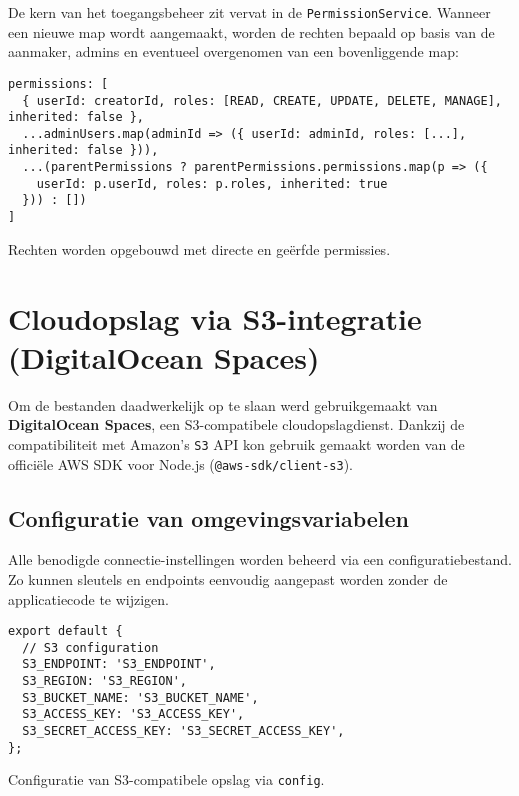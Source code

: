 De kern van het toegangsbeheer zit vervat in de \texttt{PermissionService}. Wanneer een nieuwe map wordt aangemaakt, worden de rechten bepaald op basis van de aanmaker, admins en eventueel overgenomen van een bovenliggende map:

\begin{listing}[H]
\begin{verbatim}
permissions: [
  { userId: creatorId, roles: [READ, CREATE, UPDATE, DELETE, MANAGE], inherited: false },
  ...adminUsers.map(adminId => ({ userId: adminId, roles: [...], inherited: false })),
  ...(parentPermissions ? parentPermissions.permissions.map(p => ({
    userId: p.userId, roles: p.roles, inherited: true
  })) : [])
]
\end{verbatim}
\caption[Opbouw van permissies bij mapcreatie]{Rechten worden opgebouwd met directe en geërfde permissies.}
\end{listing}

\section{Cloudopslag via S3-integratie (DigitalOcean Spaces)}

Om de bestanden daadwerkelijk op te slaan werd gebruikgemaakt van \textbf{DigitalOcean Spaces}, een S3-compatibele cloudopslagdienst. Dankzij de compatibiliteit met Amazon's \texttt{S3} API kon gebruik gemaakt worden van de officiële AWS SDK voor Node.js (\texttt{@aws-sdk/client-s3}).

\subsection{Configuratie van omgevingsvariabelen}

Alle benodigde connectie-instellingen worden beheerd via een configuratiebestand. Zo kunnen sleutels en endpoints eenvoudig aangepast worden zonder de applicatiecode te wijzigen.

\begin{listing}[H]
\begin{verbatim}
export default {
  // S3 configuration
  S3_ENDPOINT: 'S3_ENDPOINT',
  S3_REGION: 'S3_REGION',
  S3_BUCKET_NAME: 'S3_BUCKET_NAME',
  S3_ACCESS_KEY: 'S3_ACCESS_KEY',
  S3_SECRET_ACCESS_KEY: 'S3_SECRET_ACCESS_KEY',
};
\end{verbatim}
\caption[Omgevingsvariabelen voor S3]{Configuratie van S3-compatibele opslag via \texttt{config}.}
\end{listing}

